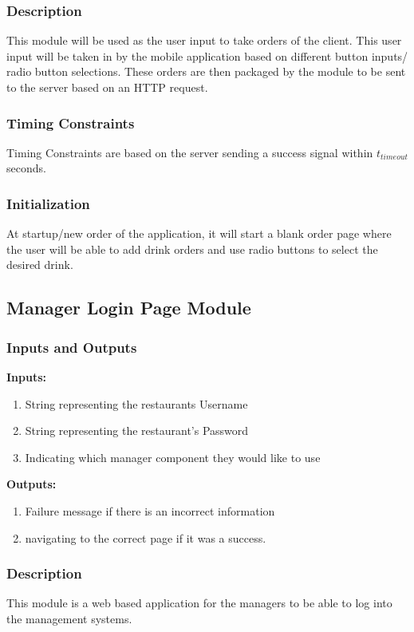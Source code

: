 \documentclass [10pt]{article}
\begin{document}
\subsubsection{Description}
This module will be used as the user input to take orders of the client. This user input will be taken in by the mobile application based on different button inputs/ radio button selections. These orders are then packaged by the module to be sent to the server based on an HTTP request.

\subsubsection{Timing Constraints}
Timing Constraints are based on the server sending a success signal within $ t_{timeout} $ seconds.

\subsubsection{Initialization}
At startup/new order of the application, it will start a blank order page where the user will be able to add drink orders and use radio buttons to select the desired drink.

\subsection{Manager Login Page Module}

\subsubsection{Inputs and Outputs}

\textbf{Inputs: } 
\begin{enumerate}
	\item String representing the restaurants Username
	\item String representing the restaurant's Password
	\item Indicating which manager component they would like to use
\end{enumerate}

\textbf{Outputs: } 
\begin{enumerate}
	\item Failure message if there is an incorrect information
	\item navigating to the correct page if it was a success.
\end{enumerate}

\subsubsection{Description}
This module is a web based application for the managers to be able to log into the management systems.
\end{document}
